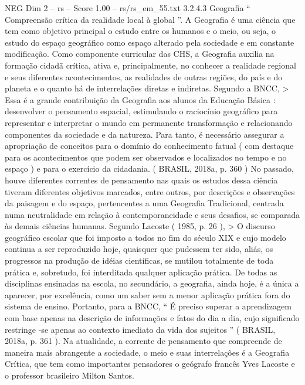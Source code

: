 \begin{textsample}{NEG Dim 2 – rs – Score 1.00 – rs/rs\_em\_55.txt}  \label{ex:f2_neg_218}
3.2.4.3 Geografia “ Compreensão crítica da realidade local à global ”.
A Geografia é uma ciência que tem como objetivo principal o estudo entre os humanos e o meio, ou seja, o estudo do espaço geográfico como espaço alterado pela sociedade e em constante modificação.
Como componente curricular das CHS, a Geografia auxilia na formação cidadã crítica, ativa e, principalmente, no conhecer a realidade regional e seus diferentes acontecimentos, as realidades de outras regiões, do país e do planeta e o quanto há de interrelações diretas e indiretas.
Segundo a BNCC, > Essa é a grande contribuição da Geografia aos alunos da Educação Básica : desenvolver o pensamento espacial, estimulando o raciocínio geográfico para representar e interpretar o mundo em permanente transformação e relacionando componentes da sociedade e da natureza.
Para tanto, é necessário assegurar a apropriação de conceitos para o domínio do conhecimento fatual ( com destaque para os acontecimentos que podem ser observados e localizados no tempo e no espaço ) e para o exercício da cidadania. ( BRASIL, 2018a, p. 360 ) No passado, houve diferentes correntes de pensamento nas quais os estudos dessa ciência tiveram diferentes objetivos marcados, entre outros, por descrições e observações da paisagem e do espaço, pertencentes a uma Geografia Tradicional, centrada numa neutralidade em relação à contemporaneidade e seus desafios, se comparada às demais ciências humanas.
Segundo Lacoste ( 1985, p. 26 ), > O discurso geográfico escolar que foi imposto a todos no fim do século XIX e cujo modelo continua a ser reproduzido hoje, quaisquer que pudessem ter sido, aliás, os progressos na produção de idéias científicas, se mutilou totalmente de toda prática e, sobretudo, foi interditada qualquer aplicação prática.
De todas as disciplinas ensinadas na escola, no secundário, a geografia, ainda hoje, é a única a aparecer, por excelência, como um saber sem a menor aplicação prática fora do sistema de ensino.
Portanto, para a BNCC, “ É preciso superar a aprendizagem com base apenas na descrição de informações e fatos do dia a dia, cujo significado restringe -se apenas ao contexto imediato da vida dos sujeitos ” ( BRASIL, 2018a, p. 361 ).
Na atualidade, a corrente de pensamento que compreende de maneira mais abrangente a sociedade, o meio e suas interrelações é a Geografia Crítica, que tem como importantes pensadores o geógrafo francês Yves Lacoste e o professor brasileiro Milton Santos.

\end{textsample}
